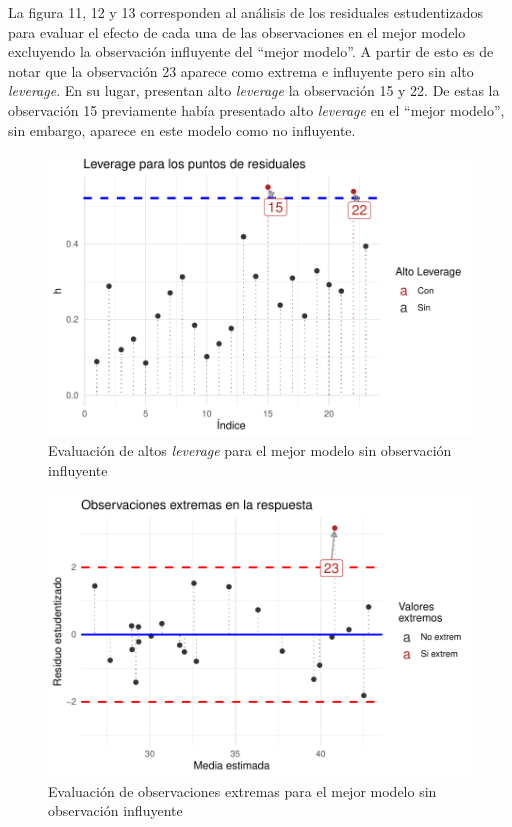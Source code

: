 \documentclass[
]{article}
\begin{document}
La figura 11, 12 y 13 corresponden al análisis de los residuales
estudentizados para evaluar el efecto de cada una de las observaciones
en el mejor modelo excluyendo la observación influyente del ``mejor
modelo''. A partir de esto es de notar que la observación 23 aparece
como extrema e influyente pero sin alto \emph{leverage}. En su lugar,
presentan alto \emph{leverage} la observación 15 y 22. De estas la
observación 15 previamente había presentado alto \emph{leverage} en el
``mejor modelo'', sin embargo, aparece en este modelo como no
influyente.

\begin{figure}
\centering
\includegraphics{diagnosticorrpp_files/figure-latex/residuals LEVERAGE para bestmodel sin 17-1.pdf}
\caption{Evaluación de altos \emph{leverage} para el mejor modelo sin
observación influyente}
\end{figure}

\begin{figure}
\centering
\includegraphics{diagnosticorrpp_files/figure-latex/observaciones EXTREMAS para bestmodel sin 17-1.pdf}
\caption{Evaluación de observaciones extremas para el mejor modelo sin
observación influyente}
\end{figure}
\end{document}
